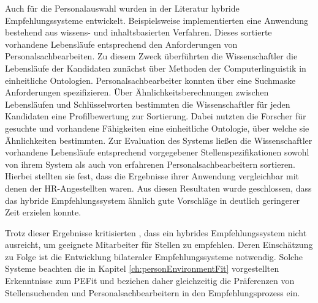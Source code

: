 Auch für die Personalauswahl wurden in der Literatur hybride Empfehlungssysteme entwickelt. Beispielsweise implementierten \textcite[S. 1ff.]{mohamed:2018} eine Anwendung bestehend aus wissens- und inhaltsbasierten Verfahren. Dieses sortierte vorhandene Lebensläufe entsprechend den Anforderungen von Personalsachbearbeiten. Zu diesem Zweck überführten die Wissenschaftler die Lebensläufe der Kandidaten zunächst über Methoden der Computerlinguistik in einheitliche Ontologien. Personalsachbearbeiter konnten über eine Suchmaske Anforderungen spezifizieren. Über Ähnlichkeitsberechnungen zwischen Lebensläufen und Schlüsselworten bestimmten die Wissenschaftler für jeden Kandidaten eine Profilbewertung zur Sortierung. Dabei nutzten die Forscher für gesuchte und vorhandene Fähigkeiten eine einheitliche Ontologie, über welche sie Ähnlichkeiten bestimmten. Zur Evaluation des Systems ließen die Wissenschaftler vorhandene Lebensläufe entsprechend vorgegebener Stellenspezifikationen sowohl von ihrem System als auch von erfahrenen Personalsachbearbeitern sortieren. Hierbei stellten sie fest, dass die Ergebnisse ihrer Anwendung vergleichbar mit denen der HR-Angestellten waren. Aus diesen Resultaten wurde geschlossen, dass das hybride Empfehlungssystem ähnlich gute Vorschläge in deutlich geringerer Zeit erzielen konnte.

Trotz dieser Ergebnisse kritisierten \textcite[S. 1ff.]{malinowski:2006}, dass ein hybrides Empfehlungssystem nicht ausreicht, um geeignete Mitarbeiter für Stellen zu empfehlen. Deren Einschätzung zu Folge ist die Entwicklung bilateraler Empfehlungssysteme notwendig. Solche Systeme beachten die in Kapitel \ref{ch:personEnvironmentFit} vorgestellten Erkenntnisse zum \ac{PEFit} und beziehen daher gleichzeitig die Präferenzen von Stellensuchenden und Personalsachbearbeitern in den Empfehlungsprozess ein.
